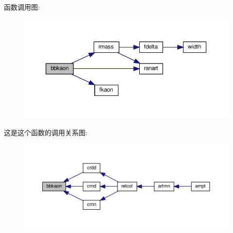 函数调用图\+:
\nopagebreak
\begin{figure}[H]
\begin{center}
\leavevmode
\includegraphics[width=350pt]{bbkaon_8f90_a0a3a439645ab2baeedbca17e9ac2f4e2_cgraph}
\end{center}
\end{figure}
这是这个函数的调用关系图\+:
\nopagebreak
\begin{figure}[H]
\begin{center}
\leavevmode
\includegraphics[width=350pt]{bbkaon_8f90_a0a3a439645ab2baeedbca17e9ac2f4e2_icgraph}
\end{center}
\end{figure}
